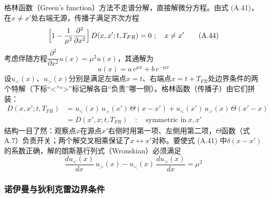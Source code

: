 格林函数（Green's function）方法不走谱分解，直接解微分方程。由式 (A.41)，在$x\ne x'$处右端无源，传播子满足齐次方程
\begin{equation*}
\Bigl[1-\frac{1}{\mu^{2}}\frac{\partial^{2}}{\partial x^{2}}\Bigr]\,
D(x,x';t,T_{FR})=0
\ ;\quad x\ne x'
\tag{A.44}
\end{equation*}
考虑伴随方程$\dfrac{\partial^2}{\partial x^2}u(x)=\mu^2 u(x)$，其通解为
\begin{equation*}
u(x)=a\,e^{\mu x}+b\,e^{-\mu x}
\end{equation*}
设$u_<(x)$、$u_>(x)$分别是满足左端点$x=t$、右端点$x=t+T_{FR}$处边界条件的两个特解（下标“<”“>”标记解各自“负责”哪一侧）。格林函数（传播子）由它们拼装：
\begin{align*}
D(x,x';t,T_{FR})
&=u_<(x)\,u_>(x')\,\Theta(x-x')
+u_<(x')\,u_>(x)\,\Theta(x'-x)\\
&=D(x',x;t,T_{FR})
\quad:\quad\text{symmetric in}\ x,x'
\end{align*}
结构一目了然：观察点$x$在源点$x'$右侧时用第一项、左侧用第二项，$\Theta$函数（式 A.7）负责开关；两个解交叉相乘保证了$x\leftrightarrow x'$对称。要使式 (A.41) 中$\delta(x-x')$的系数正确，解的朗斯基行列式（Wronskian）必须满足
\begin{equation*}
\frac{du_<(x)}{dx}\,u_>(x)-u_<(x)\,\frac{du_>(x)}{dx}=\mu^2
\end{equation*}

\subsubsection*{诺伊曼与狄利克雷边界条件}

